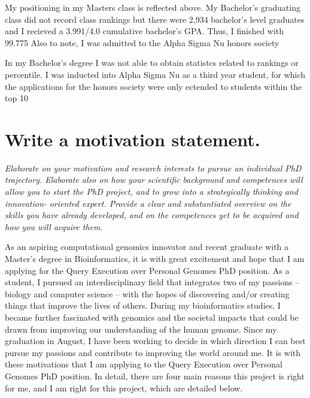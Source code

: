 {My positioning in my Masters class is reflected above.
My Bachelor's graduating class did not record class rankings but there were 2,934 bachelor's level graduates and I recieved a 3.991/4.0 cumulative bachelor's GPA. Thus, I finished with 99.775%
Also to note, I was admitted to the Alpha Sigma Nu honors society 

In my Bachelor's degree I was not able to obtain statistcs related to rankings or percentile.
I was inducted into Alpha Sigma Nu as a third year student, for which the applications for the honors society were only ectended to students within the top 10%

\section{Write a motivation statement.}
\textit{
Elaborate on your motivation and research interests to pursue an individual PhD trajectory. 
Elaborate also on how your scientific background and competences will allow you to start the PhD project, and to grow into a strategically thinking and innovation- oriented expert. 
Provide a clear and substantiated overview on the skills you have already developed, and on the competences yet to be acquired and how you will acquire them.
}

As an aspiring computational genomics innovator and recent graduate with a Master’s degree in Bioinformatics, it is with great excitement and hope that I am applying for the Query Execution over Personal Genomes PhD position. 
As a student, I pursued an interdisciplinary field that integrates two of my passions – biology and computer science – with the hopes of discovering and/or creating things that improve the lives of others. 
During my bioinformatics studies, I became further fascinated with genomics and the societal impacts that could be drawn from improving our understanding of the human genome. 
Since my graduation in August, I have been working to decide in which direction I can best pursue my passions and contribute to improving the world around me. 
It is with these motivations that I am applying to the Query Execution over Personal Genomes PhD position. 
In detail, there are four main reasons this project is right for me, and I am right for this project, which are detailed below.

}
